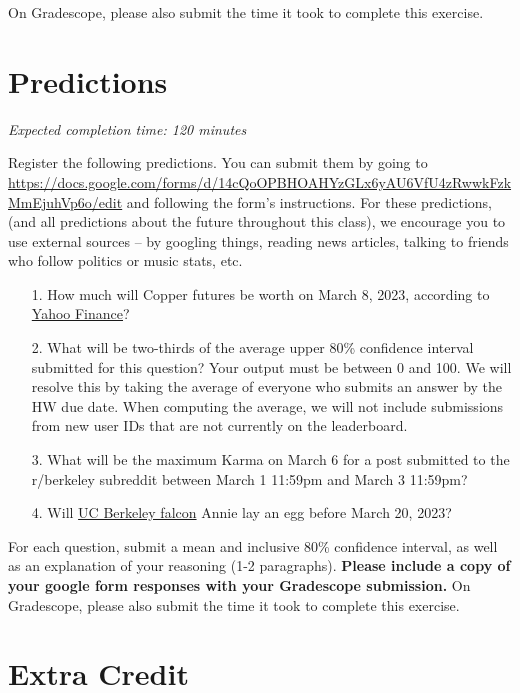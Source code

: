\documentclass[11pt]{article}
\begin{document}
On Gradescope, please also submit the time it took to complete this exercise.

\section*{Predictions}

\emph{Expected completion time: 120 minutes}

Register the following predictions. You can submit them by going to \url{https://docs.google.com/forms/d/14cQoOPBHOAHYzGLx6yAU6VfU4zRwwkFzkMmEjuhVp6o/edit} and following the form's instructions. For these predictions, (and all predictions about the future throughout this class), we encourage you to use external sources -- by googling things, reading news articles, talking to friends who follow politics or music stats, etc.

\begin{enumerate}
	\item[1.] How much will Copper futures be worth on March 8, 2023, according to \href{https://finance.yahoo.com/quote/HG%3DF?p=HG%3DF}{Yahoo Finance}? 
	
	\item[2.] What will be two-thirds of the average upper 80\% confidence interval submitted for this question? Your output must be between 0 and 100. We will resolve this by taking the average of everyone who submits an answer by the HW due date. When computing the average, we will not include submissions from new user IDs that are not currently on the leaderboard.
	
	\item[3.] What will be the maximum Karma on March 6 for a post submitted to the r/berkeley subreddit between March 1 11:59pm and March 3 11:59pm?	

	\item[4.] Will \href{https://calfalcons.berkeley.edu/}{UC Berkeley falcon} Annie lay an egg before March 20, 2023?
\end{enumerate}

For each question, submit a mean and inclusive 80\% confidence interval, as well as an explanation of your reasoning (1-2 paragraphs). \textbf{Please include a copy of your google form responses with your Gradescope submission.} On Gradescope, please also submit the time it took to complete this exercise.

\section*{Extra Credit}
\end{document}
